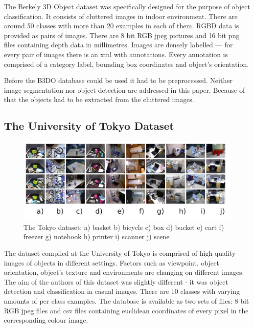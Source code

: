 	The Berkely 3D Object dataset was specifically designed for the purpose of object classification. It consists of cluttered images in indoor environment. There are around 50 classes with more than 20 examples in each of them. RGBD data is provided as pairs of images. There are 8 bit RGB jpeg pictures and 16 bit png files containing depth data in millimetres. Images are densely labelled --- for every pair of images there is an xml with annotations. Every annotation is comprised of a category label, bounding box coordinates and object's orientation.

	Before the B3DO database could be used it had to be preprocessed. Neither image segmentation nor object detection are addressed in this paper. Because of that the objects had to be extracted from the cluttered images.

	\subsection{The University of Tokyo Dataset}	
	\begin{figure}[!ht]
	\centering
	\includegraphics[width=1\textwidth]{figs/tokyo_horizontal}
	\caption{The Tokyo dataset: a) basket b) bicycle c) box d) bucket e) cart f) freezer g) notebook h) printer i) scanner j) scene}
	\label{fig:tokyo}
	\end{figure}
	
	The dataset compiled at the University of Tokyo is comprised of high quality images of objects in different settings. Factors such as viewpoint, object orientation, object's texture and environments are changing on different images. The aim of the authors of this dataset was slightly different - it was object detection and classification in casual images. There are 10 classes with varying amounts of per class examples. The database is available as two sets of files: 8 bit RGB jpeg files and csv files containing euclidean coordinates of every pixel in the corresponding colour image.


